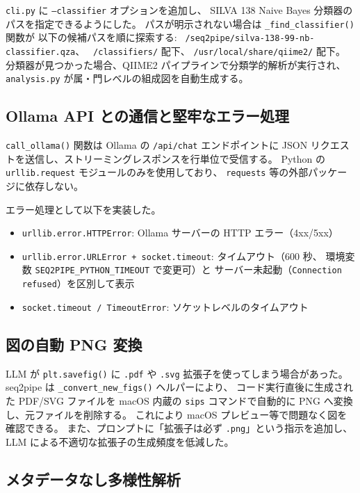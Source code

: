 \documentclass[12pt, a4paper]{article}
\begin{document}
\texttt{cli.py} に \texttt{--classifier} オプションを追加し、
SILVA 138 Naive Bayes 分類器のパスを指定できるようにした。
パスが明示されない場合は \texttt{\_find\_classifier()} 関数が
以下の候補パスを順に探索する:
\texttt{~/seq2pipe/silva-138-99-nb-classifier.qza}、
\texttt{~/classifiers/} 配下、
\texttt{/usr/local/share/qiime2/} 配下。
分類器が見つかった場合、QIIME2 パイプラインで分類学的解析が実行され、
\texttt{analysis.py} が属・門レベルの組成図を自動生成する。

\subsection{Ollama API との通信と堅牢なエラー処理}

\texttt{call\_ollama()} 関数は Ollama の \texttt{/api/chat} エンドポイントに
JSON リクエストを送信し、ストリーミングレスポンスを行単位で受信する。
Python の \texttt{urllib.request} モジュールのみを使用しており、
\texttt{requests} 等の外部パッケージに依存しない。

エラー処理として以下を実装した。
\begin{itemize}
  \item \texttt{urllib.error.HTTPError}: Ollama サーバーの HTTP エラー（4xx/5xx）
  \item \texttt{urllib.error.URLError + socket.timeout}: タイムアウト（600 秒、
    環境変数 \texttt{SEQ2PIPE\_PYTHON\_TIMEOUT} で変更可）と
    サーバー未起動（\texttt{Connection refused}）を区別して表示
  \item \texttt{socket.timeout / TimeoutError}: ソケットレベルのタイムアウト
\end{itemize}

\subsection{図の自動 PNG 変換}

LLM が \texttt{plt.savefig()} に \texttt{.pdf} や \texttt{.svg} 拡張子を使ってしまう場合があった。
seq2pipe は \texttt{\_convert\_new\_figs()} ヘルパーにより、
コード実行直後に生成された PDF/SVG ファイルを macOS 内蔵の
\texttt{sips} コマンドで自動的に PNG へ変換し、元ファイルを削除する。
これにより macOS プレビュー等で問題なく図を確認できる。
また、プロンプトに「拡張子は必ず \texttt{.png}」という指示を追加し、
LLM による不適切な拡張子の生成頻度を低減した。

\subsection{メタデータなし多様性解析}
\end{document}
